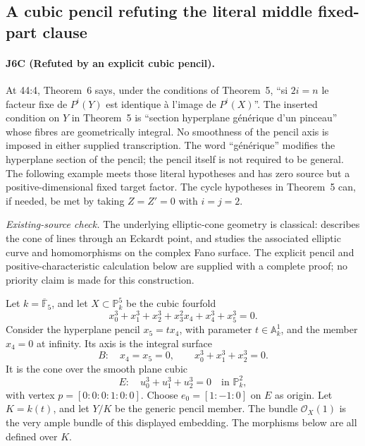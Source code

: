 \subsection{A cubic pencil refuting the literal middle fixed-part clause}
\paragraph{J6C (Refuted by an explicit cubic pencil).}
At 44:4, Theorem~6 says, under the conditions of Theorem~5,
``si $2i=n$ le facteur fixe de $P^i(Y)$ est identique à
l'image de $P^i(X)$''. The inserted condition on $Y$ in
Theorem~5 is ``section hyperplane générique d'un pinceau''
whose fibres are geometrically integral. No smoothness of the
pencil axis is imposed in either supplied transcription.
The word ``générique'' modifies the hyperplane section of the
pencil; the pencil itself is not required to be general.
The following example meets those literal hypotheses and has
zero source but a positive-dimensional fixed target factor.
The cycle hypotheses in Theorem~5 can, if needed, be met by
taking $Z=Z'=0$ with $i=j=2$.

\emph{Existing-source check.}
The underlying elliptic-cone geometry is classical:
\cite[Lemma 8.1, pp.~314--315]{DGJ_ClemensGriffiths1972}
describes the cone of lines through an Eckardt point, and
\cite[Proposition 10, p.~384; Lemma 29, p.~398]{DGJ_Roulleau2009}
studies the associated elliptic curve and homomorphisms on the
complex Fano surface. The explicit pencil and positive-characteristic
calculation below are supplied with a complete proof; no priority
claim is made for this construction.

Let $k=\overline{\mathbb F}_5$, and let $X\subset\mathbb P^5_k$
be the cubic fourfold
\begin{equation}\label{eq:J6C-fourfold}
 x_0^3+x_1^3+x_2^3+x_3^2x_4+x_4^3+x_5^3=0.
\end{equation}
Consider the hyperplane pencil $x_5=t x_4$, with parameter
$t\in\mathbb A^1_k$, and the member $x_4=0$ at infinity.
Its axis is the integral surface
\[
 B:\quad x_4=x_5=0,\qquad x_0^3+x_1^3+x_2^3=0.
\]
It is the cone over the smooth plane cubic
\[
 E:\quad u_0^3+u_1^3+u_2^3=0\quad\text{in }\mathbb P^2_k,
\]
with vertex $p=[0:0:0:1:0:0]$. Choose
$e_0=[1:-1:0]$ on $E$ as origin. Let $K=k(t)$, and let
$Y/K$ be the generic pencil member. The bundle
$\mathcal O_X(1)$ is the very ample bundle of this displayed
embedding. The morphisms below are all defined over $K$.

